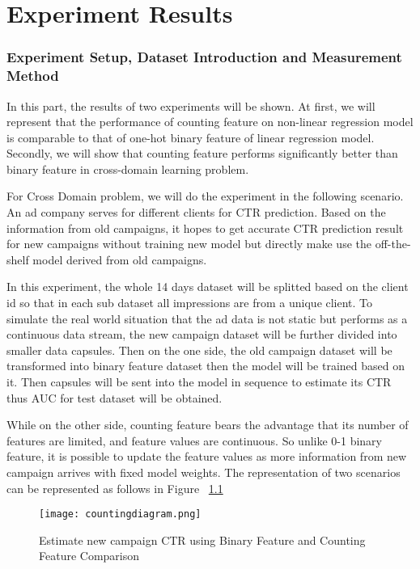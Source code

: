 \chapter{Experiment Results}
\label{chapterlabel7}

\subsection{Experiment Setup, Dataset Introduction and Measurement Method}

In this part, the results of two experiments will be shown. At first, we will represent that the performance of counting feature on non-linear regression model is comparable to that of one-hot binary feature of linear regression model. Secondly, we will show that counting feature performs significantly better than binary feature in cross-domain learning problem. 

For Cross Domain problem, we will do the experiment in the following scenario. An ad company serves for different clients for CTR prediction. Based on the information from old campaigns, it hopes to get accurate CTR prediction result for new campaigns without training new model but directly make use the off-the-shelf model derived from old campaigns. \vspace{5mm}

In this experiment, the whole 14 days dataset will be splitted based on the client id so that in each sub dataset all impressions are from a unique client. To simulate the real world situation that the ad data is not static but performs as a continuous data stream, the new campaign dataset will be further divided into smaller data capsules. Then on the one side, the old campaign dataset will be transformed into binary feature dataset then the model will be trained based on it. Then capsules will be sent into the model in sequence to estimate its CTR thus AUC for test dataset will be obtained. \vspace{5mm}

While on the other side, counting feature bears the advantage that its number of features are limited, and feature values are continuous. So unlike 0-1 binary feature, it is possible to update the feature values as more information from new campaign arrives with fixed model weights. The representation of two scenarios can be represented as follows in Figure ~\ref{fig:binary}

\begin{figure}[t]
\centering
\texttt{[image: countingdiagram.png]}
\caption{Estimate new campaign CTR using Binary Feature and Counting Feature Comparison}
\label{fig:binary}
\end{figure}




